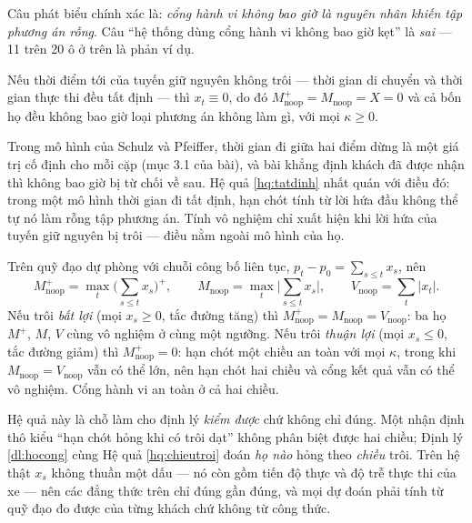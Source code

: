 Câu phát biểu chính xác là: \emph{cổng hành vi không bao giờ là nguyên nhân khiến tập phương án
rỗng}. Câu ``hệ thống dùng cổng hành vi không bao giờ kẹt'' là \emph{sai} --- 11 trên 20 ô ở trên
là phản ví dụ.

\begin{hequa}
\label{hq:tatdinh}
Nếu thời điểm tới của tuyến giữ nguyên không trôi --- thời gian di chuyển và thời gian thực thi
đều tất định --- thì $x_t \equiv 0$, do đó $M^{+}_{\text{noop}} = M_{\text{noop}} = X = 0$ và cả
bốn họ đều không bao giờ loại phương án không làm gì, với mọi $\kappa \ge 0$.
\end{hequa}

Trong mô hình của Schulz và Pfeiffer, thời gian đi giữa hai điểm dừng là một giá trị cố định cho
mỗi cặp (mục 3.1 của bài), và bài khẳng định khách đã được nhận thì không bao giờ bị từ chối về
sau. Hệ quả \ref{hq:tatdinh} nhất quán với điều đó: trong một mô hình thời gian đi tất định, hạn
chót tính từ lời hứa đầu không thể tự nó làm rỗng tập phương án. Tính vô nghiệm chỉ xuất hiện khi
lời hứa của tuyến giữ nguyên bị trôi --- điều nằm ngoài mô hình của họ.

\begin{hequa}
\label{hq:chieutroi}
Trên quỹ đạo dự phòng với chuỗi công bố liên tục, $p_t - p_0 = \sum_{s \le t} x_s$, nên
\[
M^{+}_{\text{noop}} = \max_t \Big(\sum_{s \le t} x_s\Big)^{+}, \qquad
M_{\text{noop}} = \max_t \Big|\sum_{s \le t} x_s\Big|, \qquad
V_{\text{noop}} = \sum_t |x_t| .
\]
Nếu trôi \emph{bất lợi} (mọi $x_s \ge 0$, tắc đường tăng) thì
$M^{+}_{\text{noop}} = M_{\text{noop}} = V_{\text{noop}}$: ba họ $M^{+}$, $M$, $V$ cùng vô nghiệm ở
cùng một ngưỡng. Nếu trôi \emph{thuận lợi} (mọi $x_s \le 0$, tắc đường giảm) thì
$M^{+}_{\text{noop}} = 0$: hạn chót một chiều an toàn với mọi $\kappa$, trong khi
$M_{\text{noop}} = V_{\text{noop}}$ vẫn có thể lớn, nên hạn chót hai chiều và cổng kết quả vẫn có
thể vô nghiệm. Cổng hành vi an toàn ở cả hai chiều.
\end{hequa}

Hệ quả này là chỗ làm cho định lý \emph{kiểm được} chứ không chỉ đúng. Một nhận định thô kiểu
``hạn chót hỏng khi có trôi dạt'' không phân biệt được hai chiều; Định lý \ref{dl:hocong} cùng Hệ
quả \ref{hq:chieutroi} đoán \emph{họ nào} hỏng theo \emph{chiều} trôi. Trên hệ thật $x_s$ không
thuần một dấu --- nó còn gồm tiến độ thực và độ trễ thực thi của xe --- nên các đẳng thức trên chỉ
đúng gần đúng, và mọi dự đoán phải tính từ quỹ đạo đo được của từng khách chứ không từ công thức.

